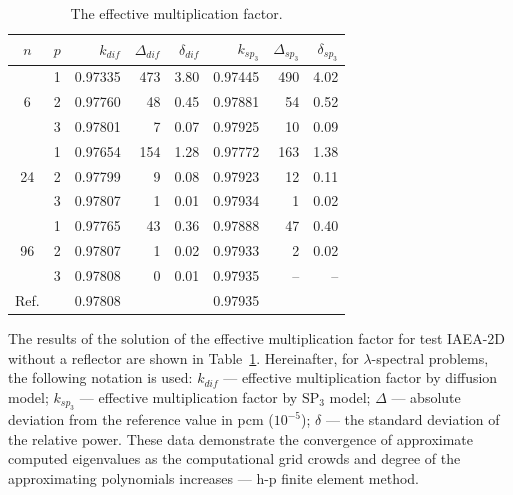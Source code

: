 \documentclass[authoryear]{elsarticle}
\begin{document}
\begin{table}[h]
\caption{The effective multiplication factor.}
\label{tab:iaea_without_lambda}
\begin{center}
\begin{tabular}{c r r r r r r r}
\hline
$n$ & $p$ & $k_{dif}$ & $\Delta_{dif}$ & $\delta_{dif}$ &$k_{sp_3}$& $\Delta_{sp_3}$ & $\delta_{sp_3}$ \\
\hline
	& 1	& 0.97335& 473& 3.80& 0.97445& 490&  4.02\\
6	& 2	& 0.97760&  48& 0.45& 0.97881&  54&  0.52\\
	& 3	& 0.97801&   7& 0.07& 0.97925&  10&  0.09\\
\hline
	& 1	& 0.97654& 154& 1.28& 0.97772& 163& 1.38\\
24& 2	& 0.97799&   9& 0.08& 0.97923&  12& 0.11\\
	& 3	& 0.97807&   1& 0.01& 0.97934&   1& 0.02\\ 
\hline
	& 1	& 0.97765&  43& 0.36& 0.97888&  47& 0.40\\
96& 2	& 0.97807&   1& 0.02& 0.97933&   2& 0.02\\
	& 3	& 0.97808&   0& 0.01& 0.97935&  --& --\\ 
\hline
Ref.&   & 0.97808&    &     & 0.97935&    &\\ 
\hline
\end{tabular}
\end{center}
\end{table}

The results of the solution of the effective multiplication factor for test IAEA-2D without a reflector are shown in Table~\ref{tab:iaea_without_lambda}.
Hereinafter, for $\lambda$-spectral problems, the following notation is used: $k_{dif}$ --- effective multiplication factor by diffusion model; $k_{sp_3}$ --- effective multiplication factor by $\mathrm{SP_3}$ model; $\Delta$ --- absolute deviation from the reference value in pcm ($10^{-5}$); $\delta$ --- the standard deviation of the relative power. %
These data demonstrate the convergence of approximate computed eigenvalues as the computational grid crowds and degree of the approximating polynomials increases --- h-p finite element method.
\end{document}
